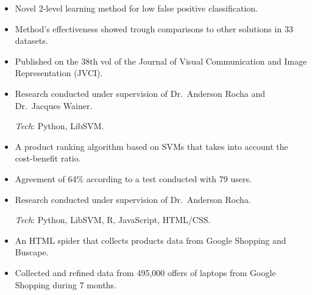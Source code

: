 \begin{resume}

\begin{position}
\vspace{1mm}
\begin{itemize}\small
\item Novel 2-level learning method for low false positive classification.
\item Method’s effectiveness showed trough comparisons to other solutions in 33
  datasets.
\item Published on the 38th vol of the Journal of Visual Communication and Image Representation (JVCI).
\item Research conducted under supervision of Dr.\ Anderson Rocha and Dr.\
  Jacques Wainer.

\vspace{1mm}
{\small \emph{Tech}: Python, LibSVM.}
\end{itemize}
\end{position}

\begin{position}
\vspace{1mm}
\begin{itemize}\small
\item A product ranking algorithm based on SVMs that takes into account the
  cost-benefit ratio.
\item Agreement of 64\% according to a test conducted with 79 users.
\item Research conducted under supervision of Dr.\ Anderson Rocha.

\vspace{1mm}
{\small \emph{Tech}: Python, LibSVM, R, JavaScript, HTML/CSS\@.}
\end{itemize}
\end{position}

\begin{position}
\vspace{1mm}
\begin{itemize}\small
  \item An HTML spider that collects products data from Google Shopping and
  Buscape.
\item Collected and refined data from 495,000 offers of laptops from Google
  Shopping during 7 months.


\end{itemize}
\end{position}
\end{resume}
